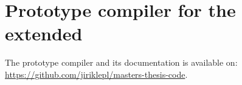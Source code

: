 \chapter{Prototype compiler for the extended \cmm}
\label{chap:proto}

The prototype compiler and its documentation is available on: \url{https://github.com/jiriklepl/masters-thesis-code}.
